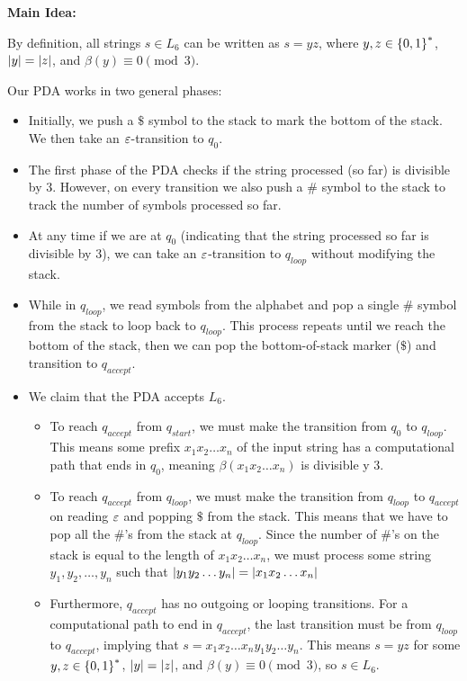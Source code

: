 \begin{Answer}
  \step
  \textbf{Main Idea:}

  \step
  By definition, all strings $s \in L_6$ can be written as $s = yz$,
  where $y, z \in \left\{0, 1\right\}^*$, $\lvert y\rvert = \lvert z\rvert$, and $\beta(y) \equiv 0 \pmod 3$.

  Our PDA works in two general phases:
  \begin{itemize}
    \item Initially, we push a $\$$ symbol to the stack to mark
      the bottom of the stack. We then take an $\varepsilon$-transition to $q_0$.
    \item The first phase of the PDA checks if the string processed
      (so far) is divisible by $3$. However, on every transition we also
      push a $\#$ symbol to the stack to track the number of symbols
      processed so far.
    \item At any time if we are at $q_0$ (indicating that the string processed
      so far is divisible by $3$), we can take an $\varepsilon$-transition to $q_{loop}$
      without modifying the stack.
    \item While in $q_{loop}$, we read symbols from the alphabet and pop
      a single $\#$ symbol from the stack to loop back to $q_{loop}$.
      This process repeats until we reach the bottom of the stack,
      then we can pop the bottom-of-stack marker ($\$$) and transition
      to $q_{accept}$.
    \newpage
    \item We claim that the PDA accepts $L_6$.
      \begin{itemize}
        \item To reach $q_{accept}$ from $q_{start}$, we must make the transition
          from $q_0$ to $q_{loop}$. This means some prefix
          $x_1 x_2 \ldots x_n$ of the input string
          has a computational path that ends in $q_0$, meaning
          $\beta(x_1 x_2 \ldots x_n)$ is divisible y $3$.
        \item To reach $q_{accept}$ from $q_{loop}$, we must make the transition
          from $q_{loop}$ to $q_{accept}$ on reading $\varepsilon$
          and popping $\$$ from the stack.
          This means that we have to pop all the $\#$'s from the stack
          at $q_{loop}$. Since the number of $\#$'s on the stack
          is equal to the length of $x_1 x_2 \ldots x_n$,
          we must process some string $y_1, y_2, \ldots, y_n$
          such that $\lvert y_1 y_2 \ldots y_n\rvert = \lvert x_1 x_2 \ldots x_n\rvert$

        \item Furthermore, $q_{accept}$ has no outgoing or looping transitions.
          For a computational path to end in $q_{accept}$,
          the last transition must be from $q_{loop}$ to $q_{accept}$,
          implying that $s = x_1 x_2 \ldots x_n y_1 y_2 \ldots y_n$.
          This means $s = yz$ for some $y, z \in \left\{0, 1\right\}^*$,
          $\lvert y\rvert = \lvert z\rvert$, and $\beta(y) \equiv 0 \pmod 3$,
          so $s \in L_6$.
      \end{itemize}
  \end{itemize}

\end{Answer}
